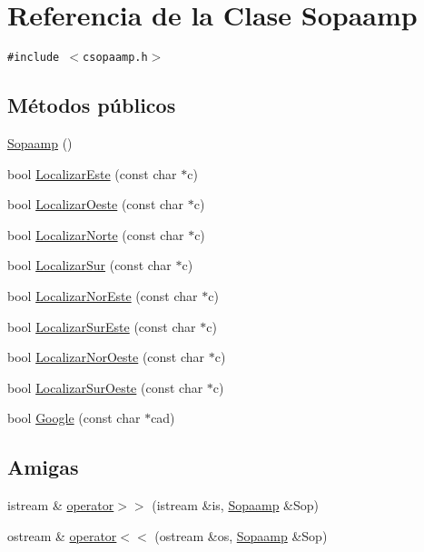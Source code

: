 \hypertarget{class_sopaamp}{
\section{Referencia de la Clase Sopaamp}
\label{class_sopaamp}
}
{\tt \#include $<$csopaamp.h$>$}

\subsection*{Métodos públicos}
\begin{CompactItemize}
\item 
\hyperlink{class_sopaamp_47547dc7d6258ce99609e93705b32526}{Sopaamp} ()
\item 
bool \hyperlink{class_sopaamp_b0fa03b65273f552bcd391325361e613}{LocalizarEste} (const char $\ast$c)
\item 
bool \hyperlink{class_sopaamp_608e1da98962ce16b3b03bcbb91f9911}{LocalizarOeste} (const char $\ast$c)
\item 
bool \hyperlink{class_sopaamp_6e80e56b5638e75e2044d0079c7c5339}{LocalizarNorte} (const char $\ast$c)
\item 
bool \hyperlink{class_sopaamp_4a034d15e58854d457345a9dd8789928}{LocalizarSur} (const char $\ast$c)
\item 
bool \hyperlink{class_sopaamp_d76fce7a733f946db1692a156312dedb}{LocalizarNorEste} (const char $\ast$c)
\item 
bool \hyperlink{class_sopaamp_0e9b2cca73363ae98088c522810cb52a}{LocalizarSurEste} (const char $\ast$c)
\item 
bool \hyperlink{class_sopaamp_a2e75da42ebca6ac51f1ec389f50c2f9}{LocalizarNorOeste} (const char $\ast$c)
\item 
bool \hyperlink{class_sopaamp_e9d0a1207aad828d2e4f208ed0ac99b5}{LocalizarSurOeste} (const char $\ast$c)
\item 
bool \hyperlink{class_sopaamp_329046ee52336b772249e080ca6b9eb2}{Google} (const char $\ast$cad)
\end{CompactItemize}
\subsection*{Amigas}
\begin{CompactItemize}
\item 
istream \& \hyperlink{class_sopaamp_a96bf6a82f391bb7b109019396d21c30}{operator$>$$>$} (istream \&is, \hyperlink{class_sopaamp}{Sopaamp} \&Sop)
\item 
ostream \& \hyperlink{class_sopaamp_aa0c812cb68673acacbc91356133ba9e}{operator$<$$<$} (ostream \&os, \hyperlink{class_sopaamp}{Sopaamp} \&Sop)
\end{CompactItemize}


